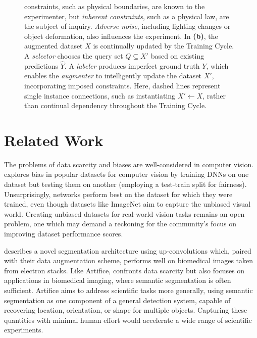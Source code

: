 \documentclass[twocolumn, 10pt]{asme2ej} %
\begin{document}
\begin{figure}
{{      constraints}, such as physical boundaries, are known to the experimenter,
    but \textit{inherent constraints}, such as a physical law, are the subject
    of inquiry. \textit{Adverse noise}, including lighting changes or object
    deformation, also influences the experiment. In \textbf{(b)}, the augmented
    dataset $X$ is continually updated by the Training Cycle. A
    \textit{selector} chooses the query set $Q \subseteq X'$ based on existing
    predictions $\hat{Y}$. A \textit{labeler} produces imperfect ground truth
    $Y$, which enables the \textit{augmenter} to intelligently update the
    dataset $X'$, incorporating imposed constraints. Here, dashed lines
    represent single instance connections, such as instantiating $X' \gets X$,
    rather than continual dependency throughout the Training Cycle.}
  \label{fig:dependency-graphs}
\end{figure}

\section{Related Work}
\label{sec:related-work}

The problems of data scarcity and biases are well-considered in computer
vision. \cite{torralba_unbiased_2011} explores bias in popular datasets for
computer vision by training DNNs on one dataset but testing them on another
(employing a test-train split for fairness). Unsurprisingly, networks perform
best on the dataset for which they were trained, even though datasets like
ImageNet aim to capture the unbiased visual world. Creating unbiased datasets
for real-world vision tasks remains an open problem, one which may demand a
reckoning for the community's focus on improving dataset performance scores.

\cite{ronneberger_u-net:_2015} describes a novel segmentation architecture using
up-convolutions which, paired with their data augmentation scheme, performs well
on biomedical images taken from electron stacks. Like Artifice,
\cite{ronneberger_u-net:_2015} confronts data scarcity but also focuses on
applications in biomedical imaging, where semantic segmentation is often
sufficient. Artifice aims to address scientific tasks more generally, using
semantic segmentation as one component of a general detection system, capable of
recovering location, orientation, or shape for multiple objects. Capturing these
quantities with minimal human effort would accelerate a wide range of scientific
experiments.
\end{document}

